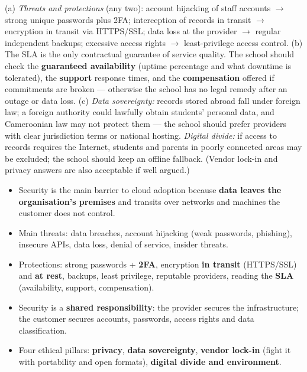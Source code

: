 \documentclass[11pt]{article}
\begin{document}
\begin{corrige}[Exercise 1]
(a) \emph{Threats and protections} (any two): account hijacking of staff accounts $\rightarrow$ strong unique passwords plus 2FA; interception of records in transit $\rightarrow$ encryption in transit via HTTPS/SSL; data loss at the provider $\rightarrow$ regular independent backups; excessive access rights $\rightarrow$ least-privilege access control.
(b) The SLA is the only contractual guarantee of service quality. The school should check the \textbf{guaranteed availability} (uptime percentage and what downtime is tolerated), the \textbf{support} response times, and the \textbf{compensation} offered if commitments are broken — otherwise the school has no legal remedy after an outage or data loss.
(c) \emph{Data sovereignty:} records stored abroad fall under foreign law; a foreign authority could lawfully obtain students' personal data, and Cameroonian law may not protect them — the school should prefer providers with clear jurisdiction terms or national hosting. \emph{Digital divide:} if access to records requires the Internet, students and parents in poorly connected areas may be excluded; the school should keep an offline fallback. (Vendor lock-in and privacy answers are also acceptable if well argued.)
\end{corrige}

\begin{aretenir}
\begin{itemize}
\item Security is the main barrier to cloud adoption because \textbf{data leaves the organisation's premises} and transits over networks and machines the customer does not control.
\item Main threats: data breaches, account hijacking (weak passwords, phishing), insecure APIs, data loss, denial of service, insider threats.
\item Protections: strong passwords + \textbf{2FA}, encryption \textbf{in transit} (HTTPS/SSL) and \textbf{at rest}, backups, least privilege, reputable providers, reading the \textbf{SLA} (availability, support, compensation).
\item Security is a \textbf{shared responsibility}: the provider secures the infrastructure; the customer secures accounts, passwords, access rights and data classification.
\item Four ethical pillars: \textbf{privacy}, \textbf{data sovereignty}, \textbf{vendor lock-in} (fight it with portability and open formats), \textbf{digital divide and environment}.
\end{itemize}
\end{aretenir}
\end{document}
